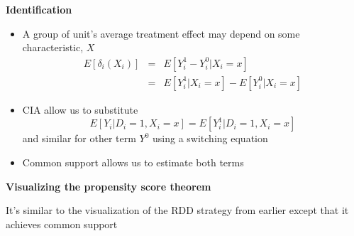 \documentclass[notes=show]{beamer}
\begin{document}
\begin{frame}[plain]
	\begin{center}
	\textbf{Identification}
	\end{center}
	
	\begin{itemize}
	\item A group of unit's average treatment effect may depend on some characteristic, $X$
		\begin{eqnarray*}
		E[\delta_i(X_i) ]&=& E[Y^1_i - Y^0_i | X_i=x] \\
		&=&E[Y^1_i | X_i=x] - E[Y^0_i | X_i=x]
		\end{eqnarray*}
	\item CIA allow us to substitute $$E[Y_i | D_i =1, X_i=x]=E[Y_i^1 | D_i=1, X_i=x]$$ and similar for other term $Y^0$ using a switching equation
	\item Common support allows us to estimate both terms
	\end{itemize}
\end{frame}		


\begin{frame}[plain]

\begin{center}
\textbf{Visualizing the propensity score theorem}
\end{center}

		\begin{center}
		\end{center}

It's similar to the visualization of the RDD strategy from earlier except that it achieves common support

\end{frame}
\end{document}
